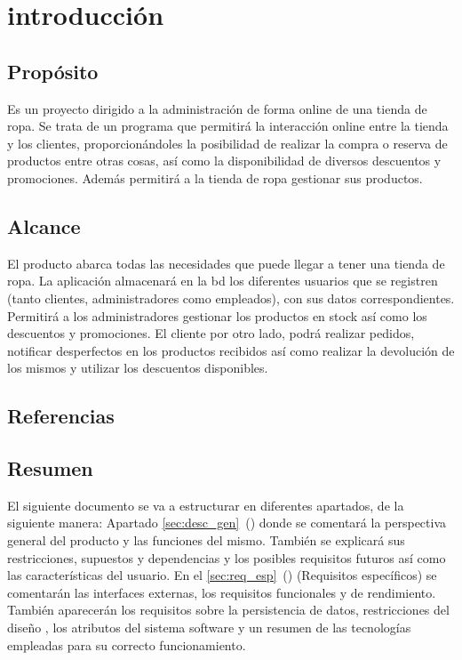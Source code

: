 \section{introducción}
\subsection{Propósito}
Es un proyecto dirigido a la administración de forma online de una tienda de ropa. Se trata de un programa que permitirá la interacción online entre la tienda y los clientes, proporcionándoles la posibilidad de realizar la compra o reserva de productos entre otras cosas, así como la disponibilidad de diversos descuentos y promociones.
Además permitirá a la tienda de ropa gestionar sus productos.
\subsection{Alcance}
El producto abarca todas las necesidades que puede llegar a tener una tienda de ropa. La aplicación almacenará en la \gls{bd} los diferentes usuarios que se registren (tanto clientes, administradores como empleados), con sus datos correspondientes.
Permitirá a los administradores gestionar los productos en stock así como los descuentos y promociones. El cliente por otro lado, podrá realizar pedidos, notificar desperfectos en los productos recibidos así como realizar la devolución de los mismos y utilizar los descuentos disponibles.

\glsaddall
\nocite{*}
{
    \printglossary[title=Definiciones\, acrónimos y abreviaturas, numberedsection]}

\subsection{Referencias}
\subsection{Resumen}
El siguiente documento se va a estructurar en diferentes apartados, de la siguiente manera: Apartado \ref{sec:desc_gen}~() donde se comentará la perspectiva general del producto y las funciones del mismo. También se explicará sus restricciones, supuestos y dependencias y los posibles requisitos futuros así como las características del usuario.
En el \ref{sec:req_esp}~() (Requisitos específicos) se comentarán las interfaces externas, los requisitos funcionales y de rendimiento. También aparecerán los requisitos sobre la persistencia de datos, restricciones del diseño , los atributos del sistema software y un resumen de las tecnologías empleadas para su correcto funcionamiento.
